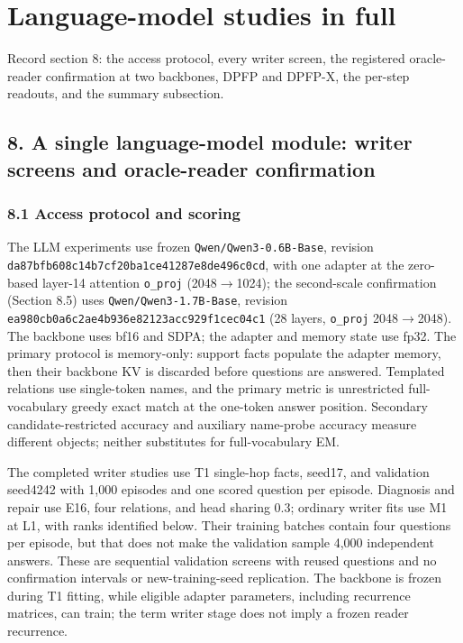 \section{Language-model studies in full}\label{app:F}
\noindent Record section 8: the access protocol, every writer screen, the registered oracle-reader confirmation at two backbones, DPFP and DPFP-X, the per-step readouts, and the summary subsection.
\subsection*{8. A single language-model module: writer screens and oracle-reader confirmation}

\subsubsection*{8.1 Access protocol and scoring}

The LLM experiments use frozen \texttt{Qwen/\allowbreak{}Qwen3-0.6B-Base}, revision
\texttt{da87bfb6\allowbreak{}08c14b7c\allowbreak{}f20ba1ce\allowbreak{}41287e8d\allowbreak{}e496c0cd}, with one adapter at the zero-based
layer-14 attention \texttt{o\_proj} (2048\ensuremath{\rightarrow}1024); the second-scale confirmation (Section 8.5) uses \texttt{Qwen/\allowbreak{}Qwen3-1.7B-Base}, revision
\texttt{ea980cb0\allowbreak{}a6c2ae4b\allowbreak{}936e8212\allowbreak{}3acc929f\allowbreak{}1cec04c1} (28 layers, \texttt{o\_proj} 2048\ensuremath{\rightarrow}2048). The backbone uses bf16 and  %
SDPA; the adapter and memory state use fp32. The primary protocol  %
is memory-only: support facts populate the adapter memory, then their backbone
KV is discarded before questions are answered. Templated relations  %
use single-token names, and the primary metric is unrestricted full-vocabulary
greedy exact match at the one-token answer position. Secondary  %
candidate-restricted accuracy and auxiliary name-probe accuracy measure different
objects; neither substitutes for full-vocabulary EM.  %

The completed writer studies use T1 single-hop facts, seed17, and validation
seed4242 with 1,000 episodes and one scored question per episode.  %
Diagnosis and repair use E16, four relations, and head sharing 0.3; ordinary
writer fits use M1 at L1, with ranks identified below.  %
Their training batches contain four questions per episode, but that does not
make the validation sample 4,000 independent answers.  %
These are sequential validation screens with reused questions and no confirmation
intervals or new-training-seed replication.  %
The backbone is frozen during T1 fitting, while eligible adapter parameters,
including recurrence matrices, can train; the term writer stage does not imply
a frozen reader recurrence.  %

